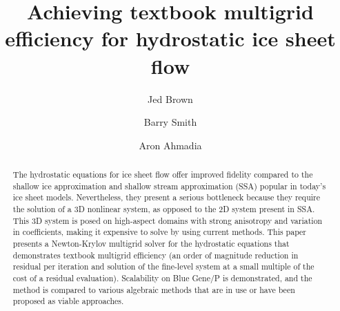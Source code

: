 \documentclass[draft,lineno,jgrga]{AGUTeX}
\begin{document}
\title{Achieving textbook multigrid efficiency for hydrostatic ice sheet flow}

\author{Jed Brown}
\author{Barry Smith}
\author{Aron Ahmadia}

\begin{abstract}
The hydrostatic equations for ice sheet flow offer improved fidelity compared to the shallow ice approximation and shallow stream approximation (SSA) popular in today's ice sheet models. Nevertheless, they present a serious bottleneck because they require the solution of a 3D nonlinear system, as opposed to the 2D system present in SSA.  This 3D system is posed on high-aspect domains with strong anisotropy and variation in coefficients, making it expensive to solve by using current methods.  This paper presents a Newton-Krylov multigrid solver for the hydrostatic equations that demonstrates textbook multigrid efficiency (an order of magnitude reduction in residual per iteration and solution of the fine-level system at a small multiple of the cost of a residual evaluation).  Scalability on Blue Gene/P is demonstrated, and the method is compared to various algebraic methods that are in use or have been proposed as viable approaches.
\end{abstract}
\end{document}
